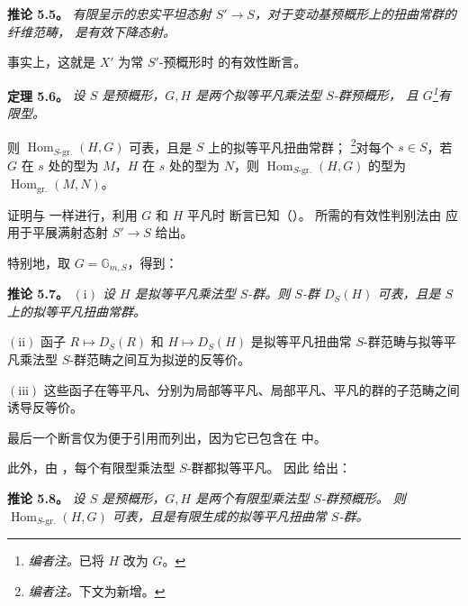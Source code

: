 \par\medskip\noindent
\textbf{推论 5.5。}\enspace
\emph{有限呈示的忠实平坦态射 \(S'\to S\)，对于变动基预概形上的扭曲常群的纤维范畴，
是有效下降态射。}

事实上，这就是 \(X'\) 为常 \(S'\)-预概形时  的有效性断言。

\par\medskip\noindent
\textbf{定理 5.6。}\enspace
\begingroup\itshape
设 \(S\) 是预概形，\(G,H\) 是两个拟等平凡乘法型 \(S\)-群预概形，
且 \(G\)\footnote{\textit{编者注。}已将 \(H\) 改为 \(G\)。}有限型。

则 \(\operatorname{Hom}_{S\text{-gr.}}(H,G)\) 可表，且是 \(S\) 上的拟等平凡扭曲常群；
\footnote{\textit{编者注。}下文为新增。}对每个 \(s\in S\)，若 \(G\) 在 \(s\)
处的型为 \(M\)，\(H\) 在 \(s\) 处的型为 \(N\)，则
\(\operatorname{Hom}_{S\text{-gr.}}(H,G)\) 的型为 \(\operatorname{Hom}_{\mathrm{gr.}}(M,N)\)。
\par\endgroup

证明与  一样进行，利用 \(G\) 和 \(H\) 平凡时
断言已知（）。
所需的有效性判别法由  应用于平展满射态射
\(S'\to S\) 给出。

特别地，取 \(G=\mathbb G_{m,S}\)，得到：

\par\medskip\noindent
\textbf{推论 5.7。}\enspace
\begingroup\itshape
\(\mathrm{(i)}\) 设 \(H\) 是拟等平凡乘法型 \(S\)-群。则 \(S\)-群 \(D_S(H)\)
可表，且是 \(S\) 上的拟等平凡扭曲常群。

\smallskip
\noindent
\(\mathrm{(ii)}\) 函子 \(R\mapsto D_S(R)\) 和 \(H\mapsto D_S(H)\)
是拟等平凡扭曲常 \(S\)-群范畴与拟等平凡乘法型 \(S\)-群范畴之间互为拟逆的反等价。

\smallskip
\noindent
\(\mathrm{(iii)}\) 这些函子在等平凡、分别为局部等平凡、局部平凡、平凡的群的子范畴之间诱导反等价。
\par\endgroup

最后一个断言仅为便于引用而列出，因为它已包含在  中。

此外，由 ，每个有限型乘法型 \(S\)-群都拟等平凡。
因此 给出：

\par\medskip\noindent
\textbf{推论 5.8。}\enspace
\emph{设 \(S\) 是预概形，\(G,H\) 是两个有限型乘法型 \(S\)-群预概形。
则 \(\operatorname{Hom}_{S\text{-gr.}}(H,G)\) 可表，且是有限生成的拟等平凡扭曲常 \(S\)-群。}


